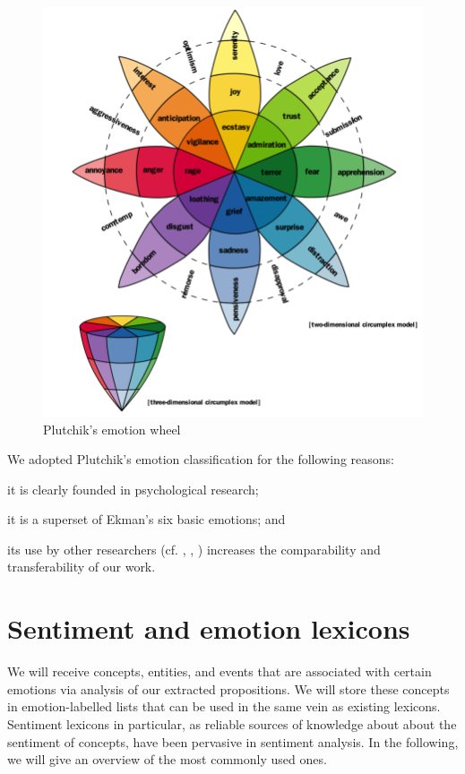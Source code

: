 \begin{figure}[bth]
\includegraphics[width=.80\linewidth]{gfx/plutchik_wheel_emotion.png}
\caption{Plutchik's emotion wheel}\label{fig:plutchik}
\end{figure}

We adopted Plutchik's emotion classification for the following reasons:\begin{inparaenum} \item it is clearly founded in psychological research; \item it is a superset of Ekman's six basic emotions; and \item its use by other researchers (cf. \cite{nrc}, \cite{adjective_noun_pairs}, \cite{emotions_novels_fairy_tales}) increases the comparability and transferability of our work.
\end{inparaenum}

\section{Sentiment and emotion lexicons}

We will receive concepts, entities, and events that are associated with certain emotions via analysis of our extracted propositions. We will store these concepts in emotion-labelled lists that can be used in the same vein as existing lexicons. Sentiment lexicons in particular, as reliable sources of knowledge about about the sentiment of concepts, have been pervasive in sentiment analysis. In the following, we will give an overview of the most commonly used ones.

